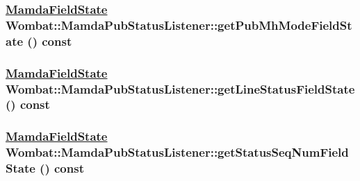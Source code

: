 \hypertarget{classWombat_1_1MamdaPubStatusListener_94bb9e1391c14ff70c13813bd8598182}{
\subsubsection[getPubMhModeFieldState]{\setlength{\rightskip}{0pt plus 5cm}\hyperlink{namespaceWombat_93aac974f2ab713554fd12a1fa3b7d2a}{Mamda\-Field\-State} Wombat::Mamda\-Pub\-Status\-Listener::get\-Pub\-Mh\-Mode\-Field\-State () const}}
\label{classWombat_1_1MamdaPubStatusListener_94bb9e1391c14ff70c13813bd8598182}


\hypertarget{classWombat_1_1MamdaPubStatusListener_7e8e85060e206e639d9a61c608ddb48f}{
\subsubsection[getLineStatusFieldState]{\setlength{\rightskip}{0pt plus 5cm}\hyperlink{namespaceWombat_93aac974f2ab713554fd12a1fa3b7d2a}{Mamda\-Field\-State} Wombat::Mamda\-Pub\-Status\-Listener::get\-Line\-Status\-Field\-State () const}}
\label{classWombat_1_1MamdaPubStatusListener_7e8e85060e206e639d9a61c608ddb48f}


\hypertarget{classWombat_1_1MamdaPubStatusListener_d17d5c19c2ac8ca47502eea6a9931845}{
\subsubsection[getStatusSeqNumFieldState]{\setlength{\rightskip}{0pt plus 5cm}\hyperlink{namespaceWombat_93aac974f2ab713554fd12a1fa3b7d2a}{Mamda\-Field\-State} Wombat::Mamda\-Pub\-Status\-Listener::get\-Status\-Seq\-Num\-Field\-State () const}}
\label{classWombat_1_1MamdaPubStatusListener_d17d5c19c2ac8ca47502eea6a9931845}


